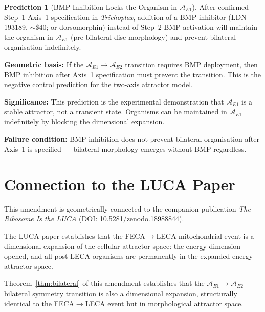\documentclass[12pt, a4paper]{article}
\theoremstyle{definition}
\newtheorem{prediction}{Prediction}[section]
\theoremstyle{remark}
\begin{document}
\begin{prediction}[BMP Inhibition Locks the Organism
in $\mathcal{A}_{E1}$]
\label{pred:lock}
After confirmed Step~1 Axis~1 specification in
\textit{Trichoplax}, addition of a BMP inhibitor
(LDN-193189, $\sim$\$40; or dorsomorphin) instead of
Step~2 BMP activation will maintain the organism in
$\mathcal{A}_{E1}$ (pre-bilateral disc morphology)
and prevent bilateral organisation indefinitely.

\textbf{Geometric basis:} If the $\mathcal{A}_{E1}
\to \mathcal{A}_{E2}$ transition requires BMP
deployment, then BMP inhibition after Axis~1
specification must prevent the transition. This is
the negative control prediction for the two-axis
attractor model.

\textbf{Significance:} This prediction is the
experimental demonstration that $\mathcal{A}_{E1}$ is
a stable attractor, not a transient state. Organisms
can be maintained in $\mathcal{A}_{E1}$ indefinitely
by blocking the dimensional expansion.

\textbf{Failure condition:} BMP inhibition does not
prevent bilateral organisation after Axis~1 is
specified --- bilateral morphology emerges without
BMP regardless.
\end{prediction}

\section{Connection to the LUCA Paper}

This amendment is geometrically connected to the companion
publication \textit{The Ribosome Is the LUCA}
(DOI: \href{https://doi.org/10.5281/zenodo.18988844}
{10.5281/zenodo.18988844}).

The LUCA paper establishes that the FECA$\to$LECA
mitochondrial event is a dimensional expansion of the
cellular attractor space: the energy dimension opened,
and all post-LECA organisms are permanently in the
expanded energy attractor space.

Theorem~\ref{thm:bilateral} of this amendment establishes
that the $\mathcal{A}_{E1} \to \mathcal{A}_{E2}$
bilateral symmetry transition is also a dimensional
expansion, structurally identical to the FECA$\to$LECA
event but in morphological attractor space.
\end{document}
